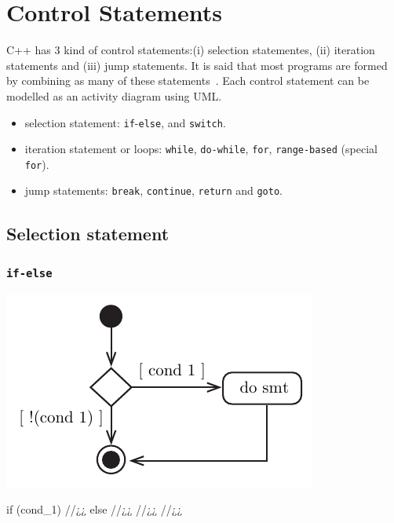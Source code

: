 \section{Control Statements}
\label{sec:Control-Statements}

C++ has 3 kind of control statements:(i) selection statementes, (ii) iteration statements and (iii) jump statements. It is said that most programs are formed by combining as many of these statements~\cite{deitel2017c++}. Each control statement can be modelled as an activity diagram using \ac{UML}.

\begin{itemize}
    \item selection statement: \texttt{if}-\texttt{else}, and \texttt{switch}.
    \item iteration statement or loops: \texttt{while}, \texttt{do-while}, \texttt{for}, \texttt{range-based} (special \texttt{for}).
    \item jump statements: \texttt{break}, \texttt{continue}, \texttt{return} and \texttt{goto}.
\end{itemize}

\subsection{Selection statement}
\subsubsection{\texttt{if-else}}

\begin{minipage}{.50\textwidth}
\centering
\includegraphics[width=0.65\linewidth]{01_Basics/figures/uml/SelectionStatement-00-UML-if-else.pdf}
\label{fig:ch01_Basics_UML_SelStatement-00-if-else}
\end{minipage}
\begin{minipage}{.25\textwidth}
\begin{CPPCode}
if (cond_1)
{
    //¿¿
}
else
{
    //¿¿
    //¿¿
    //¿¿
}
\end{CPPCode}
\end{minipage}
\vspace{0.5cm}

